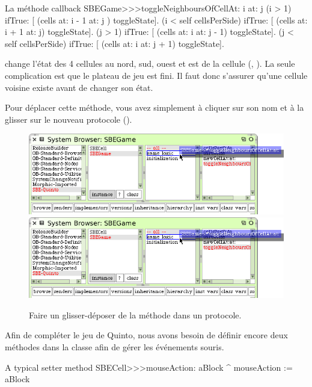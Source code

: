 \documentclass[a4paper,10pt,twoside]{book}
\begin{document}
\begin{method}[toggleNeighboursOfCellAt:at:]{La méthode callback}
SBEGame>>>toggleNeighboursOfCellAt: i at: j
   (i > 1) ifTrue: [ (cells at: i - 1 at: j ) toggleState].
   (i < self cellsPerSide) ifTrue: [ (cells at: i + 1 at: j) toggleState].
   (j > 1) ifTrue: [ (cells at: i  at: j - 1) toggleState].
   (j < self cellsPerSide) ifTrue: [ (cells at: i at: j + 1) toggleState].
\end{method}

 change l'état des 4 cellules au nord, sud, ouest et est de la cellule (, ). La seule complication est que le plateau de jeu est fini. Il faut donc s'assurer qu'une cellule voisine existe avant de changer son état.


Pour déplacer cette méthode, vous avez simplement à cliquer sur son nom et à la glisser sur le nouveau protocole ().

\begin{figure}[htbp]
   \centering
   \ifluluelse
		{\includegraphics[width=\textwidth]{DragMethod} }
		{\includegraphics[scale=0.7]{DragMethod} }
   \caption{Faire un glisser-déposer de la méthode dans un protocole.\label{fig:dragMethod}}
\end{figure}

Afin de compléter le jeu de Quinto, nous avons besoin de définir encore deux méthodes dans la classe  afin de gérer les événements souris.
\begin{method}[mouseAction:]{A typical setter method}
SBECell>>>mouseAction: aBlock
   ^ mouseAction := aBlock
\end{method}
\end{document}
